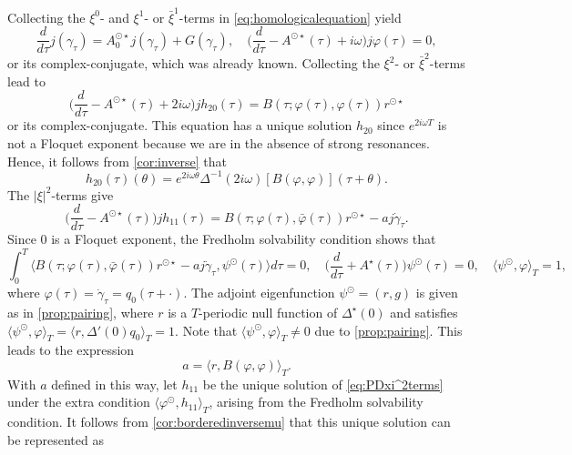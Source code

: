 \documentclass[english]{myarticle}
\begin{document}
\begin{sloppypar}
Collecting the $\xi^0$- and $\xi^1$- or $\bar{\xi}^1$-terms  in \eqref{eq:homologicalequation} yield
\begin{equation*}
    \frac{d}{d\tau} j({\gamma}_\tau) = A_0^{\odot \star} j(\gamma_\tau) + G(\gamma_\tau), \quad \bigg(\frac{d}{d \tau} - A^{\odot \star}(\tau) + i \omega \bigg)j\varphi(\tau) = 0,
\end{equation*}
or its complex-conjugate, which was already known. Collecting the $\xi^2$- or $\bar{\xi}^2$-terms lead to
\begin{equation*}
    \bigg(\frac{d}{d \tau} - A^{\odot \star}(\tau) + 2i\omega \bigg)jh_{20}(\tau) = B(\tau;\varphi(\tau),\varphi(\tau))r^{\odot \star}
\end{equation*}
or its complex-conjugate. This equation has a unique solution $h_{20}$ since $e^{2 i \omega T}$ is not a Floquet exponent because we are in the absence of strong resonances. Hence, it follows from \cref{cor:inverse} that
\begin{equation*}
    h_{20}(\tau)(\theta) = e^{2 i \omega\theta} \Delta^{-1}(2 i \omega)[B(\varphi,\varphi)](\tau + \theta).
\end{equation*}
The $|\xi|^2$-terms give
\begin{equation*}
    \bigg( \frac{d}{d \tau} - A^{\odot \star}(\tau) \bigg)j h_{11}(\tau) = B(\tau;\varphi(\tau),\bar{\varphi}(\tau))r^{\odot \star} - a j\dot{\gamma}_\tau.
\end{equation*}
Since $0$ is a Floquet exponent, the Fredholm solvability condition shows that 
\begin{equation*}
    \int_0^T \langle B(\tau;\varphi(\tau),\bar{\varphi}(\tau))r^{\odot \star} - aj \dot{\gamma}_\tau, \psi^{\odot}(\tau) \rangle d\tau = 0, \quad  \bigg(\frac{d}{d \tau} + A^\star(\tau) \bigg)\psi^{\odot}(\tau) = 0, \quad \langle \psi^\odot, \varphi \rangle_T = 1,
\end{equation*}
where $\varphi(\tau) = \dot{\gamma}_\tau = q_0(\tau + \cdot)$. The adjoint eigenfunction $\psi^\odot = (r,g)$ is given as in \cref{prop:pairing}, where $r$ is a $T$-periodic null function of $\Delta^\star(0)$ and satisfies $\langle \psi^\odot,\varphi \rangle_T = \langle r, \Delta'(0)q_0 \rangle_T = 1$. Note that $\langle \psi^{\odot},\varphi \rangle_T \neq 0$ due to \cref{prop:pairing}. This leads to the expression
\begin{equation*}
    a = \langle r,B(\varphi,\varphi) \rangle_T.
\end{equation*}
With $a$ defined in this way, let $h_{11}$ be the unique solution of \eqref{eq:PDxi^2terms} under the extra condition $\langle \varphi^{\odot}, h_{11} \rangle_T$, arising from the Fredholm solvability condition. It follows from \cref{cor:borderedinversemu} that this unique solution can be represented as

\end{sloppypar}
\end{document}
